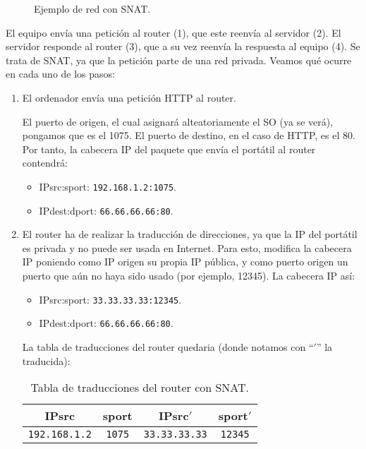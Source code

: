 \begin{ejemplo}
\begin{figure}
\begin{tikzpicture}[node distance=6cm]
        \end{tikzpicture}
        \caption{Ejemplo de red con \acrshort{SNAT}.}
        \label{fig:ejemplo_nat}
    \end{figure}

    El equipo envía una petición al router (1), que este reenvía al servidor (2). El servidor responde al router (3), que a su vez reenvía la respuesta al equipo (4). Se trata de \acrshort{SNAT}, ya que la petición parte de una red privada. Veamos qué ocurre en cada uno de los pasos:
    \begin{enumerate}[label=(\arabic*)]
        \item El ordenador envía una petición \acrshort{HTTP} al router.
        
        El puerto de origen, el cual asignará alteatoriamente el SO (ya se verá), pongamos que es el 1075. El puerto de destino, en el caso de \acrshort{HTTP}, es el 80. Por tanto, la cabecera IP del paquete que envía el portátil al router contendrá:
        \begin{itemize}
            \item {IPsrc}:{sport}: \verb|192.168.1.2:1075|.
            \item {IPdest}:{dport}: \verb|66.66.66.66:80|.
        \end{itemize}
            
        \item El router ha de realizar la traducción de direcciones, ya que la IP del portátil es privada y no puede ser usada en Internet. Para esto, modifica la cabecera IP poniendo como IP origen su propia IP pública, y como puerto origen un puerto que aún no haya sido usado (por ejemplo, 12345). La cabecera IP así:
        \begin{itemize}
            \item {IPsrc}:{sport}: \verb|33.33.33.33:12345|.
            \item {IPdest}:{dport}: \verb|66.66.66.66:80|.
        \end{itemize}

        La tabla de traducciones del router quedaria (donde notamos con ``$'$'' la traducida):
        \begin{table}[H]
            \centering
            \begin{tabular}{|c|c||c|c|}
                \hline
                IPsrc & sport & IPsrc$'$ & sport$'$ \\
                \hline
                \verb|192.168.1.2| & \verb|1075| & \verb|33.33.33.33| & \verb|12345|\\
                \hline
            \end{tabular}
            \caption{Tabla de traducciones del router con SNAT.}
            \label{tab:tabla_traducciones}            
        \end{table}


\end{enumerate}
\end{ejemplo}
